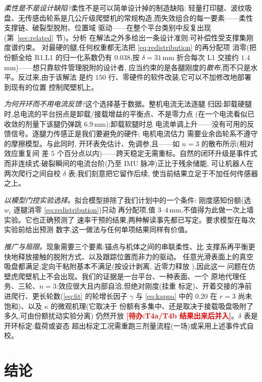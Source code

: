 \documentclass[journal]{IEEEtran}
\newcommand{\TODO}[1]{\textcolor{red}{\textbf{[待办:#1]}}}
\begin{document}
\emph{柔性是不是设计缺陷?}柔性不是可以简单设计掉的制造缺陷:
轻量打印腿、波纹吸盘、无传感齿轮系是几公斤级爬壁机的常规构造,而失效组合的每一要素——柔性支撑链、破裂型脱附、位置域
驱动——在整个平台类别中反复出现(第~\ref{sec:related} 节)。分析
在解法之外多给出一条设计准则:可补偿性受支撑集刚度谱约束。
对最硬的腿,任何权重都无法把 \eqref{eq:redistribution} 的再分配项
消零(把份额全给 R1,L1 的归一化系数仍有 $0.038$,按 $\delta=31$\,mm
折合每次 L1 交接约 $1.4$\,mm)——想只靠软件管理脱附的设计者,
应当约束的是各腿刚度的\emph{散布},而不只是水平。反过来,由于该解法
是约 $150$ 行、零硬件的软件改装,它可以不加修改地部署到现有的位置
控制爬壁机上。

\emph{为何开环而不用电流反馈?}这个选择基于数据。整机电流无法逐腿
归因:卸载硬腿时,总电流的平台拐点是卸载/接载增益的平衡点、不是零力点
(在一个电流看似已收敛的剂量下该腿仍弹跳 $6.9$\,mm);卸载软腿时总
电流单调上升——没有可用的反馈信号。逐腿力传感正是我们要避免的硬件;
电机电流估力
\cite{wahrburg2018motor} 需要业余齿轮系不遵守的摩擦模型。与此同时,
开环表免估计、免调参,且——如 $n{=}3$ 的散布所示(相对效应重复间
差 $5$ 个百分点以内)——跨天稳定无需重标。自然的闭环升级是事件式
而非连续式:破裂瞬间的电流台阶(乃至 IMU 脉冲)正比于残余储能,
可让机器人在两次爬行之间自校 $\delta$ 表;我们刻意把它留作后续,
使当前结果立足于不加任何传感器之上。

\emph{以模型门控实验选择。}拟合模型排除了我们计划中的一个条件:
刚度感知份额(选 $w_i$ 逐腿消零 \eqref{eq:redistribution})只动
再分配项,值 $3$--$4$\,mm,不值得为此做一次上墙实验。它也正确预测了
速率干预的结果,两种解读事先都已写定。要求模型在每次实验前给出预测
数字,这一做法与任何单项结果同样有价值。

\emph{推广与局限。}现象需要三个要素:锚点与机体之间的串联柔性、比
支撑系再平衡更快地释放接触的脱附方式、以及跟踪位置而非力的驱动。
任意光滑表面上的真空吸盘都满足;定向干粘附基本不满足(按设计剥离,
近零力释放 \cite{autumn2006frictional,kim2008smooth}),因此这一
问题在仿壁虎爬壁机上不会出现。我们的证据是一台平台、一种表面、一个
原地代理任务、三轮、$n{=}3$:效应很大且内部自洽,但绝对刚度(挂重
标定)、开着交接的净前进爬行、更长轮数(\eqref{eq:fit} 的轮增长因子 $\gamma$ 与 \eqref{eq:kappa}
中的 $0.20$ 在 $r{=}3$ 尚未饱和)、以及 $\kappa$ 的微观机理(它取决于
份额有多集中、还是取决于接载吸盘吸附了多久,可由份额扰动实验分离)
仍然开放
\TODO{T4a/T4b 结果出来后并入}。$\delta$ 表是开环标定:载荷或姿态
超出标定工况需重跑三剂量流程(一场)或采用上述事件式自校。

\section{结论}
\end{document}
